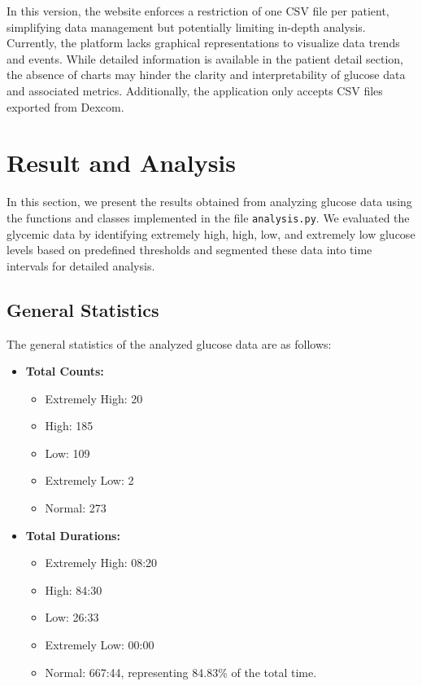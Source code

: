 \documentclass{article}
\begin{document}
In this version, the website enforces a restriction of one CSV file per patient, simplifying data management but potentially limiting in-depth analysis. Currently, the platform lacks graphical representations to visualize data trends and events. While detailed information is available in the patient detail section, the absence of charts may hinder the clarity and interpretability of glucose data and associated metrics. Additionally, the application only accepts CSV files exported from Dexcom.

\section{Result and Analysis}
\label{sec:result_analysis}
In this section, we present the results obtained from analyzing glucose data using the functions and classes implemented in the file \texttt{analysis.py}. We evaluated the glycemic data by identifying extremely high, high, low, and extremely low glucose levels based on predefined thresholds and segmented these data into time intervals for detailed analysis.


\subsection{General Statistics}

The general statistics of the analyzed glucose data are as follows:

\begin{itemize}
    \item \textbf{Total Counts:}
    \begin{itemize}
        \item Extremely High: 20
        \item High: 185
        \item Low: 109
        \item Extremely Low: 2
        \item Normal: 273
    \end{itemize}
    
    \item \textbf{Total Durations:}
    \begin{itemize}
        \item Extremely High: 08:20
        \item High: 84:30
        \item Low: 26:33
        \item Extremely Low: 00:00
        \item Normal: 667:44, representing 84.83\% of the total time.

    \end{itemize}

\end{itemize}
\end{document}
